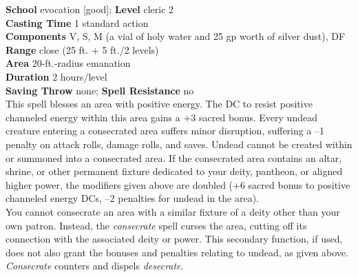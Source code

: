 \textbf{School} evocation [good]; \textbf{Level} cleric 2\\
\textbf{Casting Time} 1 standard action\\
\textbf{Components} V, S, M (a vial of holy water and 25 gp worth of silver dust), DF\\
\textbf{Range} close (25 ft. + 5 ft./2 levels)\\
\textbf{Area} 20-ft.-radius emanation\\
\textbf{Duration} 2 hours/level\\
\textbf{Saving Throw} none; \textbf{Spell Resistance} no\\
This spell blesses an area with positive energy. The DC to resist positive channeled energy within this area gains a +3 sacred bonus. Every undead creature entering a consecrated area suffers minor disruption, suffering a –1 penalty on attack rolls, damage rolls, and saves. Undead cannot be created within or summoned into a consecrated area. If the consecrated area contains an altar, shrine, or other permanent fixture dedicated to your deity, pantheon, or aligned higher power, the modifiers given above are doubled (+6 sacred bonus to positive channeled energy DCs, –2 penalties for undead in the area).\\
You cannot consecrate an area with a similar fixture of a deity other than your own patron. Instead, the \textit{consecrate }spell curses the area, cutting off its connection with the associated deity or power. This secondary function, if used, does not also grant the bonuses and penalties relating to undead, as given above.\\
\textit{Consecrate }counters and dispels \textit{desecrate}.\\
